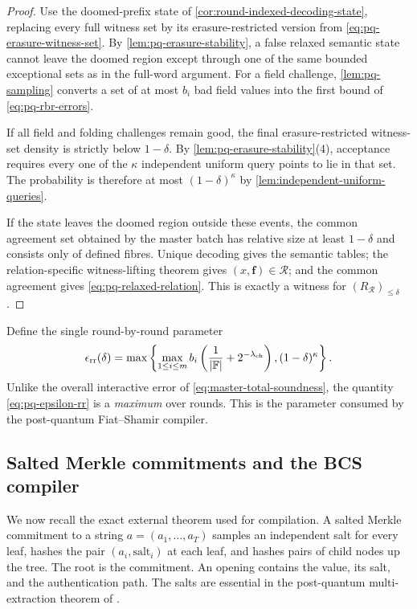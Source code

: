 \begin{proof}
Use the doomed-prefix state of \cref{cor:round-indexed-decoding-state}, replacing every full witness set by its erasure-restricted version from \cref{eq:pq-erasure-witness-set}.  By \cref{lem:pq-erasure-stability}, a false relaxed semantic state cannot leave the doomed region except through one of the same bounded exceptional sets as in the full-word argument.  For a field challenge, \cref{lem:pq-sampling} converts a set of at most $b_i$ bad field values into the first bound of \eqref{eq:pq-rbr-errors}.

If all field and folding challenges remain good, the final erasure-restricted witness-set density is strictly below $1-\delta$.  By \cref{lem:pq-erasure-stability}(4), acceptance requires every one of the $\kappa$ independent uniform query points to lie in that set.  The probability is therefore at most $(1-\delta)^\kappa$ by \cref{lem:independent-uniform-queries}.

If the state leaves the doomed region outside these events, the common agreement set obtained by the master batch has relative size at least $1-\delta$ and consists only of defined fibres.  Unique decoding gives the semantic tables; the relation-specific witness-lifting theorem gives $(x,\mathbf f)\in\mathcal R$; and the common agreement gives \eqref{eq:pq-relaxed-relation}.  This is exactly a witness for $(R_{\mathcal R})_{\le\delta}$.
\end{proof}

Define the single round-by-round parameter
\begin{equation}
  \epsilon_{\mathrm{rr}}(\delta)
  =\max\left\{
      \max_{1\le i\le m}
      b_i\left(\frac1{|\mathbb{F}|}+2^{-\lambda_{\mathrm{ch}}}\right),
      (1-\delta)^\kappa
    \right\}.
  \label{eq:pq-epsilon-rr}
\end{equation}
Unlike the overall interactive error of \cref{eq:master-total-soundness}, the quantity \eqref{eq:pq-epsilon-rr} is a \emph{maximum} over rounds.  This is the parameter consumed by the post-quantum Fiat--Shamir compiler.

\subsection{Salted Merkle commitments and the BCS compiler}
\label{sec:pq-bcs}

We now recall the exact external theorem used for compilation.  A salted Merkle commitment to a string $a=(a_1,\ldots,a_T)$ samples an independent salt for every leaf, hashes the pair $(a_i,\mathrm{salt}_i)$ at each leaf, and hashes pairs of child nodes up the tree.  The root is the commitment.  An opening contains the value, its salt, and the authentication path.  The salts are essential in the post-quantum multi-extraction theorem of \cite{CDHZ25}.

